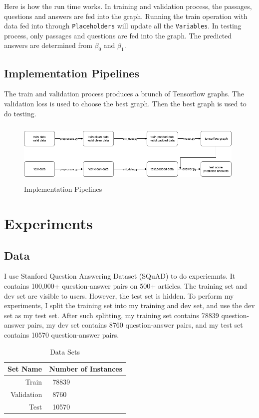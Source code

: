 \documentclass[modernstyle,12pt]{sjsuthesis}
\theoremstyle{definition}
\begin{document}
Here is how the run time works. In training and validation process, the passages, questions and answers are fed into the graph. Running the train operation with data fed into through {\tt Placeholders} will update all the {\tt Variables}. In testing process, only passages and questions are fed into the graph. The predicted answers are determined from $\beta _0$ and $\beta _1$.






\section{Implementation Pipelines}

The train and validation process produces a brunch of Tensorflow graphs. The validation loss is used to choose the best graph. Then the best graph is used to do testing.

\begin{figure}[htbp]\centering
  \includegraphics[width=11cm, height=3cm]{figures/pipeline.png}
  \caption{Implementation Pipelines}
  \label{f:pipeline}
\end{figure}


\chapter{Experiments}
\section{Data}
I use Stanford Question Answering Dataset (SQuAD) to do experiemnts.  It contains 100,000+ question-answer pairs on 500+ articles. The training set and dev set are visible to users. However, the test set is hidden. To perform my experiments, I split the training set into my training and dev set, and use the dev set as my test set. After such splitting, my training set contains 78839 question-answer pairs, my dev set contains 8760 question-answer pairs, and my test set contains 10570 question-answer pairs.

\begin{table}[htbp]\centering
  \caption{Data Sets}
  \label{tab:dataset}
  \begin{tabular}{|r|l|} \hline
    Set Name & Number of Instances \\ \hline\hline
    Train & \ 78839 \\
    Validation & \ 8760 \\
    Test & \ 10570 \\ \hline
  \end{tabular}
\end{table}
\end{document}
